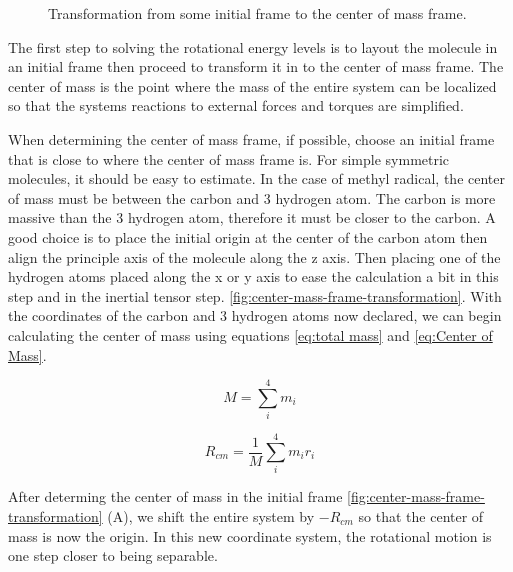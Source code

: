 \documentclass[11pt,a4paper]{book}
\newcommand{\imginput}[1]{} %
\begin{document}
			\begin{figure} [!ht]
				\centering
				\Large
				\def\svgwidth{\columnwidth}
				\resizebox{14cm}{!}{\imginput{images/center-mass-frame-transformation.pdf_tex}}
				\caption{Transformation from some initial frame to the center of mass frame.}
				\label{fig:center-mass-frame-transformation}
			\end{figure}	
			
			The first step to solving the rotational energy levels is to layout the molecule in an initial frame then proceed to transform it in to the center of mass frame. The center of mass is the point where the mass of the entire system can be localized so that the systems reactions to external forces and torques are simplified.
			
			When determining the center of mass frame, if possible, choose an initial frame that is close to where the center of mass frame is. For simple symmetric molecules, it should be easy to estimate. In the case of methyl radical, the center of mass must be between the carbon and 3 hydrogen atom. The carbon is more massive than the 3 hydrogen atom, therefore it must be closer to the carbon. A good choice is to place the initial origin at the center of the carbon atom then align the principle axis of the molecule along the z axis. Then placing one of the hydrogen atoms placed along the x or y axis to ease the calculation a bit in this step and in the inertial tensor step. \autoref{fig:center-mass-frame-transformation}. With the coordinates of the carbon and 3 hydrogen atoms now declared, we can begin calculating the center of mass using equations \autoref{eq:total mass} and  \autoref{eq:Center of Mass}.
			
			\begin{equation}
				\label{eq:total mass}
				M = \sum_i^4{m_i}
			\end{equation}
			
			\begin{equation}
				\label{eq:Center of Mass}
				R_{cm}=\dfrac{1}{M}\sum_i^4{m_ir_i} 
			\end{equation}


			After determing the center of mass in the initial frame \autoref{fig:center-mass-frame-transformation} (A), we shift the entire system by $-R_{cm}$ so that the center of mass is now the origin. In this new coordinate system, the rotational motion is one step closer to being separable.
			
\end{document}
